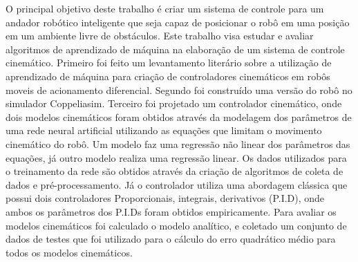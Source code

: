 %
%

O principal objetivo deste trabalho é criar um  sistema de
controle para um andador robótico inteligente que seja capaz de
posicionar o robô em uma posição em um ambiente livre de obstáculos.
Este trabalho visa estudar e avaliar algoritmos de aprendizado
de máquina na elaboração de um sistema de controle cinemático.
Primeiro foi feito um levantamento literário sobre a utilização de
aprendizado de máquina para criação de controladores cinemáticos em robôs moveis de acionamento
diferencial. Segundo foi construído uma versão do robô no simulador Coppeliasim.
Terceiro foi projetado um controlador cinemático, onde dois modelos
cinemáticos foram obtidos através da modelagem dos parâmetros de uma
rede neural artificial utilizando as equações que limitam o movimento
cinemático do robô. Um modelo faz uma regressão não linear dos
parâmetros das equações, já outro modelo realiza uma regressão linear.
Os dados utilizados para o treinamento da rede são obtidos
através da criação de  algoritmos de coleta de dados e pré-processamento.
Já o controlador utiliza uma abordagem
clássica que possui  dois controladores
Proporcionais, integrais, derivativos (P.I.D),
onde ambos os parâmetros dos P.I.Ds foram obtidos empiricamente.
Para avaliar os modelos cinemáticos foi calculado o modelo analítico,
e coletado um conjunto de
dados de testes que foi utilizado para o cálculo do erro quadrático
médio para todos os modelos cinemáticos.
